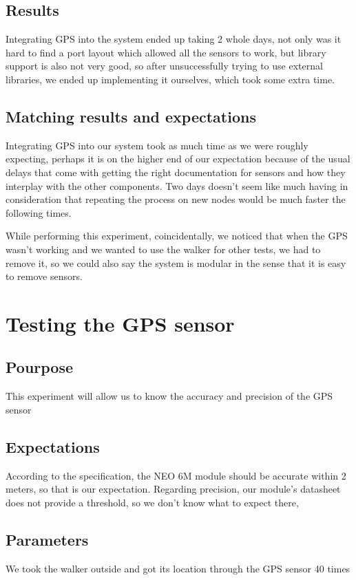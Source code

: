 	\subsection{Results}
	Integrating GPS into the system ended up taking 2 whole days, not only was it hard to find a port layout which allowed all the sensors to work, but library support is also not very good, so after unsuccessfully trying to use external libraries, we ended up implementing it ourselves, which took some extra time.

	\subsection{Matching results and expectations}
	Integrating GPS into our system took as much time as we were roughly expecting, perhaps it is on the higher end of our expectation because of the usual delays that come with getting the right documentation for sensors and how they interplay with the other components. Two days doesn't seem like much having in consideration that repeating the process on new nodes would be much faster the following times.

	While performing this experiment, coincidentally, we noticed that when the GPS wasn't working and we wanted to use the walker for other tests, we had to remove it, so we could also say the system is modular in the sense that it is easy to remove sensors.

\section{Testing the GPS sensor}

	\subsection{Pourpose}
		This experiment will allow us to know the accuracy and precision of the GPS sensor
	\subsection{Expectations}
		According to the specification, the NEO 6M module should be accurate within 2 meters, so that is our expectation. Regarding precision, our module's datasheet does not provide a threshold, so we don't know what to expect there,

	\subsection{Parameters}
		We took the walker outside and got its location through the GPS sensor 40 times

